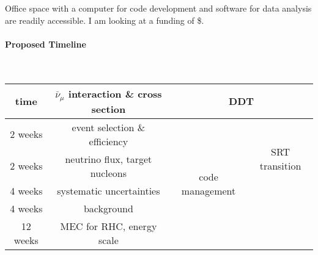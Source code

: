 \documentclass[a4paper, 11pt]{article} %
\begin{document}
Office space with a computer for code development and software for data analysis are readily accessible. I am looking at a funding of \$\underline{\hspace{2cm}}.
\clearpage

\paragraph{\textbf{Proposed Timeline}}\hspace*{\fill}\\

\begin{table}[!htbp]
  \centering
  \begin{tabular}{|c|c|c|c|}
    \hline
    time & $\bar{\nu}_\mu$ interaction \& cross section & \multicolumn{2}{c|}{DDT} \\
    \hline
    2 weeks & event selection \& efficiency & \multirow{5}{*}{code management} & \multirow{3}{*}{SRT transition} \\
    \hhline{--~~}
    2 weeks & neutrino flux, target nucleons & & \\
    \hhline{--~~}
    4 weeks & systematic uncertainties & & \\
    \hhline{--~-}
    4 weeks & background & & \\
    \hhline{--~}
    12 weeks & MEC for RHC, energy scale & & \\
	\hline
  \end{tabular}
  \label{T:peak}
\end{table}






\end{document}
